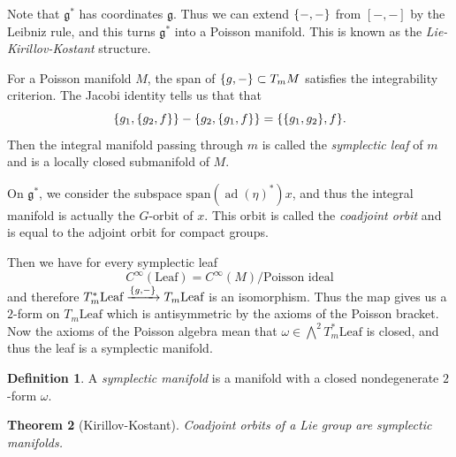 \documentclass[leqno, openany]{memoir}
\newtheorem{thm}{Theorem}[section]
\theoremstyle{definition}
\newtheorem{defn}[thm]{Definition}
\theoremstyle{remark}
\theoremstyle{plain}
\theoremstyle{definition}
\theoremstyle{remark}
\newcommand{\mf}[1]{\mathfrak{#1}}
\newcommand{\mr}[1]{\mathrm{#1}}
\DeclareMathOperator{\ad}{ad}
\begin{document}
Note that $\mf{g}^*$ has coordinates $\mf{g}$. Thus we can extend $\qty{-,-}$ from $[-,-]$ by the Leibniz rule, and this turns $\mf{g}^*$ into a Poisson manifold. This is known as the \textit{Lie-Kirillov-Kostant} structure.

For a Poisson manifold $M$, the span of $\qty{g,-} \subset T_m M$ satisfies the integrability criterion. The Jacobi identity tells us that that
\[ \qty{g_1, \qty{g_2, f}} - \qty{g_2, \qty{g_1, f}} = \qty{\qty{g_1, g_2}, f}. \]
Then the integral manifold passing through $m$ is called the \textit{symplectic leaf} of $m$ and is a locally closed submanifold of $M$.

On $\mf{g}^*$, we consider the subspace $\mr{span}(\ad(\eta)^*) x$, and thus the integral manifold is actually the $G$-orbit of $x$. This orbit is called the \textit{coadjoint orbit} and is equal to the adjoint orbit for compact groups. 

Then we have for every symplectic leaf
\[ C^{\infty}(\text{Leaf}) = C^{\infty}(M) / \text{Poisson ideal} \]
and therefore $T_m^* \text{Leaf} \xrightarrow{\qty{g,-}} T_m \text{Leaf}$ is an isomorphism. Thus the map gives us a $2$-form on $T_m \text{Leaf}$ which is antisymmetric by the axioms of the Poisson bracket. Now the axioms of the Poisson algebra mean that $\omega \in \bigwedge^2 T_m^* \text{Leaf}$ is closed, and thus the leaf is a symplectic manifold.

\begin{defn}
    A \textit{symplectic manifold} is a manifold with a closed nondegenerate $2$-form $\omega$. 
\end{defn}

\begin{thm}[Kirillov-Kostant]
    Coadjoint orbits of a Lie group are symplectic manifolds.
\end{thm}
\end{document}
